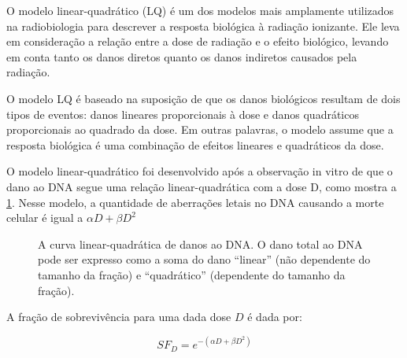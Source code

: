 \documentclass[11pt,a4paper]{article}
\begin{document}
	O modelo linear-quadrático (LQ) é um dos modelos mais amplamente utilizados na radiobiologia para descrever a resposta biológica à radiação ionizante. Ele leva em consideração a relação entre a dose de radiação e o efeito biológico, levando em conta tanto os danos diretos quanto os danos indiretos causados pela radiação.

	O modelo LQ é baseado na suposição de que os danos biológicos resultam de dois tipos de eventos: danos lineares proporcionais à dose e danos quadráticos proporcionais ao quadrado da dose. Em outras palavras, o modelo assume que a resposta biológica é uma combinação de efeitos lineares e quadráticos da dose.

	O modelo linear-quadrático foi desenvolvido após a observação in vitro de que o dano ao DNA segue uma relação linear-quadrática com a dose D, como mostra a \ref{fig:modeloLinearQuadratico2}. Nesse modelo, a quantidade de aberrações letais no DNA causando a morte celular é  igual a $\alpha D + \beta D^2$ 

	\begin{figure}[h]
		\centering
		\caption{A curva linear-quadrática de danos ao DNA. O dano total ao DNA pode ser expresso como a soma do dano “linear” (não dependente do tamanho da fração) e “quadrático” (dependente do tamanho da fração).}
		\label{fig:modeloLinearQuadratico2}
	\end{figure}

	A fração de sobrevivência para uma dada dose $D$ é dada por:

	\begin{equation}
		SF_{D} = e^{- \left(\alpha D + \beta D^2\right)}
	\end{equation}
\end{document}
